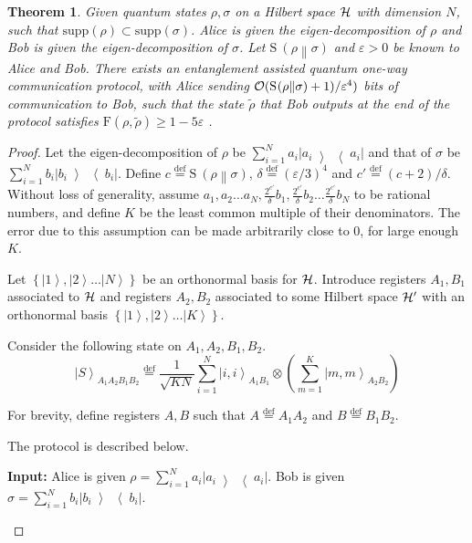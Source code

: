 \documentclass[11pt,a4paper]{article}
\def\F{\mathrn{F}}
\def\O{\CMcal{O}}
\def\H{\CMcal{H}}
\theoremstyle{plain}
\newtheorem{theorem}{Theorem}[section]
\theoremstyle{definition}
\newcommand {\br} [1] {\ensuremath{ \left( #1 \right) }}
\newcommand {\minusspace} {\: \! \!}
\newcommand {\fn} [2] {\ensuremath{ #1 \minusspace \br{ #2 } }}
\newcommand {\defeq} {\ensuremath{ \stackrel{\mathrm{def}}{=} }}
\newcommand {\relent} [2] {\fn{\mathrm{S}}{#1 \middle\| #2}}
\newcommand {\ket} [1] {\ensuremath{ \left| #1 \right\rangle }}
\newcommand {\ketbratwo} [2] {\ensuremath{ \left| #1 \middle\rangle \middle\langle #2 \right| }}
\newcommand {\ketbra} [1] {\ketbratwo{#1}{#1}}
\newcommand {\set} [1] {\ensuremath{ \left\lbrace #1 \right\rbrace }}
\def\ve{{\varepsilon}}
\def\F{\mathrm{F}}
\begin{document}
\begin{theorem}\label{thm:protocol}
\label{qbev}
Given quantum states $\rho,\sigma$ on a Hilbert space $\H$ with dimension $N$, such that $\text{supp}(\rho) \subset \text{supp}(\sigma)$. Alice is given the eigen-decomposition of $\rho$ and Bob is given the eigen-decomposition of $\sigma$. Let  $\relent{\rho}{\sigma}$ and $\ve >0$ be known to Alice and Bob. There exists an entanglement assisted quantum one-way communication protocol, with Alice sending $\O(\relent{\rho}{\sigma}+1)/\ve^4)$ bits of communication to Bob, such that the state $\tilde{\rho}$ that Bob outputs at the end of the protocol satisfies  $\F(\rho,\tilde{\rho})\geq 1-5\ve$ .
\end{theorem}

\begin{proof}
Let the eigen-decomposition of $\rho$ be $\sum_{i=1}^Na_i\ketbra{a_i}$ and that of $\sigma$ be $\sum_{i=1}^Nb_i\ketbra{b_i}$. Define $c\defeq\relent{\rho}{\sigma}$, $\delta \defeq (\ve/3)^4$ and $c' \defeq (c+2)/\delta$. Without loss of generality, assume $a_1,a_2\ldots a_N, \frac{2^{c'}}{\delta}b_1,\frac{2^{c'}}{\delta}b_2\ldots \frac{2^{c'}}{\delta}b_N$ to be rational numbers, and define $K$ be the least common multiple of their denominators. The error due to this assumption can be made arbitrarily close to $0$, for large enough $K$.  

Let $\set{\ket{1},\ket{2}\ldots \ket{N}}$ be an orthonormal basis for $\H$. Introduce registers $A_1,B_1$ associated to $\H$ and registers $A_2,B_2$ associated to some Hilbert space $\H'$ with an orthonormal basis $\set{\ket{1},\ket{2}\ldots \ket{K}}$.
 
Consider the following state on $A_1,A_2,B_1,B_2$. 
\begin{equation}
\label{eq:sharedstate}
\ket{S}_{A_1A_2B_1B_2} \defeq \frac{1}{\sqrt{KN}}\sum_{i=1}^N \ket{i,i}_{A_1B_1} \otimes \left( \sum_{m=1}^{K}\ket{m, m}_{A_2B_2} \right)
\end{equation}

For brevity, define registers $A,B$ such that $A\defeq A_1A_2$ and $B\defeq B_1B_2$.

The protocol is described below.

\begin{mdframed}
\bigskip
\textbf{Input:} Alice is given $\rho=\sum_{i=1}^Na_i\ketbra{a_i}$. Bob is given $\sigma=\sum_{i=1}^Nb_i\ketbra{b_i}$.
\bigskip



\end{mdframed}
\end{proof}
\end{document}
